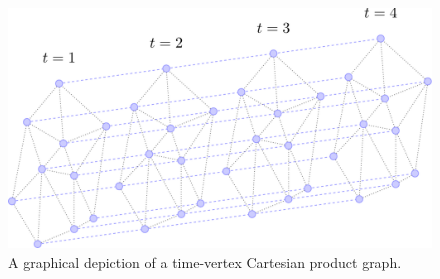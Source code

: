 \vspace{1cm}


\begin{figure}[t]
    \begin{center}
        \includegraphics[width=0.75\linewidth]{Figures/TV.pdf}
    \end{center}
    \caption[A time-vertex Cartesian product graph]{A graphical depiction of a time-vertex Cartesian product graph. }
    \label{fig:TV}
\end{figure}



